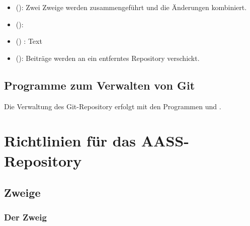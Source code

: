 \documentclass[
ngerman,
paper=a4,
asymmetric,
fontsize=10pt,
draft=false,
numbers=noenddot,
bibtotocnumbered,
footnotes=multiple,
toc=flat,
]{scrbook}
\newcommand{\Branch}[1]{\emph{#1}}
\begin{document}
\begin{itemize}
\begin{itemize}
    Es können nur lokale Zweige am jeweiligen
    Computer bearbeitet werden.
    \item {}  ():
    Ein entfernter Zweig ist ein Zweig in einem anderen Repository. Seine Bezsichnung
    beginnt mit dem prefix \Branch{remotes/repository},
    wobei \Branch{repository} für die Bezeichnung des jeweiligen
    Repository steht. So ist z.\,B. 
    \Branch{remotes/origin/master} der
    \Branch{master}-Branch des Repository \Branch{origin}.
    \item {} {()}:
    Damit entfernte Zweige bearbeitet werden können, gibt es verbundene Zweige: Sie
    sind , aber haben einen Eintrag, welche sie
    mit einem entfernten Zweig verbinden. Änderungen an
    diesen Zweigen werden beim Versenden in die
    entsprechenden entfernten Zweige geschrieben.
  \end{itemize}
  \item {}  (): Zwei Zweige
  werden zusammengeführt und die Änderungen kombiniert.
  \item {} ():  
  \item {} () :
  Text
  \item {} (): Beiträge werden an
  ein entferntes Repository verschickt.
\end{itemize}

\subsection{Programme zum Verwalten von Git}

Die Verwaltung des Git-Repository erfolgt mit den Programmen
 und .

\section{Richtlinien für das AASS-Repository}

\subsection{Zweige}

\subsubsection{Der Zweig }
\end{document}
